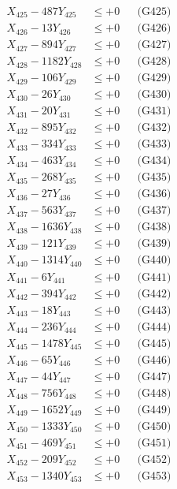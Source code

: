 \documentclass[a4paper,10pt]{article}
\begin{document}
{\begin{align}
X_{425} - 487Y_{425} &\leq +0 && \text{(G425)} \\
X_{426} - 13Y_{426} &\leq +0 && \text{(G426)} \\
X_{427} - 894Y_{427} &\leq +0 && \text{(G427)} \\
X_{428} - 1182Y_{428} &\leq +0 && \text{(G428)} \\
X_{429} - 106Y_{429} &\leq +0 && \text{(G429)} \\
X_{430} - 26Y_{430} &\leq +0 && \text{(G430)} \\
\allowbreak
X_{431} - 20Y_{431} &\leq +0 && \text{(G431)} \\
X_{432} - 895Y_{432} &\leq +0 && \text{(G432)} \\
X_{433} - 334Y_{433} &\leq +0 && \text{(G433)} \\
X_{434} - 463Y_{434} &\leq +0 && \text{(G434)} \\
X_{435} - 268Y_{435} &\leq +0 && \text{(G435)} \\
X_{436} - 27Y_{436} &\leq +0 && \text{(G436)} \\
X_{437} - 563Y_{437} &\leq +0 && \text{(G437)} \\
X_{438} - 1636Y_{438} &\leq +0 && \text{(G438)} \\
X_{439} - 121Y_{439} &\leq +0 && \text{(G439)} \\
X_{440} - 1314Y_{440} &\leq +0 && \text{(G440)} \\
\allowbreak
X_{441} - 6Y_{441} &\leq +0 && \text{(G441)} \\
X_{442} - 394Y_{442} &\leq +0 && \text{(G442)} \\
X_{443} - 18Y_{443} &\leq +0 && \text{(G443)} \\
X_{444} - 236Y_{444} &\leq +0 && \text{(G444)} \\
X_{445} - 1478Y_{445} &\leq +0 && \text{(G445)} \\
X_{446} - 65Y_{446} &\leq +0 && \text{(G446)} \\
X_{447} - 44Y_{447} &\leq +0 && \text{(G447)} \\
X_{448} - 756Y_{448} &\leq +0 && \text{(G448)} \\
X_{449} - 1652Y_{449} &\leq +0 && \text{(G449)} \\
X_{450} - 1333Y_{450} &\leq +0 && \text{(G450)} \\
\allowbreak
X_{451} - 469Y_{451} &\leq +0 && \text{(G451)} \\
X_{452} - 209Y_{452} &\leq +0 && \text{(G452)} \\
X_{453} - 1340Y_{453} &\leq +0 && \text{(G453)} \\

\end{align}}
\end{document}
